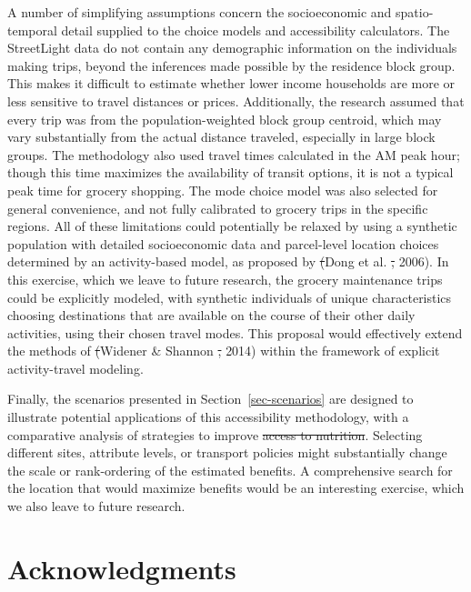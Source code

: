 \documentclass[
  letterpaper,
  number,
  review,
  3p]{elsarticle}
\makeatletter
\providecommand{\DIFadd}[1]{{\protect\color{blue}\uwave{#1}}} %
\providecommand{\DIFdel}[1]{{\protect\color{red}\sout{#1}}} %
\providecommand{\DIFaddbegin}{} %
\providecommand{\DIFaddend}{} %
\providecommand{\DIFdelbegin}{} %
\providecommand{\DIFdelend}{} %
\newcommand{\DIFscaledelfig}{0.5}
\newlength{\DIFdelgraphicswidth} %
\newlength{\DIFdelgraphicsheight} %
\newcommand{\DIFaddincludegraphics}[2][]{{\color{blue}\fbox{\DIFOincludegraphics[#1]{#2}}}} %
\newcommand{\DIFdelincludegraphics}[2][]{%
\sbox{\DIFdelgraphicsbox}{\DIFOincludegraphics[#1]{#2}}%
\settoboxwidth{\DIFdelgraphicswidth}{\DIFdelgraphicsbox} %
\settoboxtotalheight{\DIFdelgraphicsheight}{\DIFdelgraphicsbox} %
\scalebox{\DIFscaledelfig}{%
\parbox[b]{\DIFdelgraphicswidth}{\usebox{\DIFdelgraphicsbox}\\[-\baselineskip] \rule{\DIFdelgraphicswidth}{0em}}\llap{\resizebox{\DIFdelgraphicswidth}{\DIFdelgraphicsheight}{%
\setlength{\unitlength}{\DIFdelgraphicswidth}%
\begin{picture}(1,1)%
\thicklines\linethickness{2pt} %
{\color[rgb]{1,0,0}\put(0,0){\framebox(1,1){}}}%
{\color[rgb]{1,0,0}\put(0,0){\line( 1,1){1}}}%
{\color[rgb]{1,0,0}\put(0,1){\line(1,-1){1}}}%
\end{picture}%
}\hspace*{3pt}}} %
} %
\DeclareRobustCommand{\DIFaddbegin}{\DIFOaddbegin \let\includegraphics\DIFaddincludegraphics} %
\DeclareRobustCommand{\DIFaddend}{\DIFOaddend \let\includegraphics\DIFOincludegraphics} %
\DeclareRobustCommand{\DIFdelbegin}{\DIFOdelbegin \let\includegraphics\DIFdelincludegraphics} %
\DeclareRobustCommand{\DIFdelend}{\DIFOaddend \let\includegraphics\DIFOincludegraphics} %
\let\sout@orig\sout %
\renewcommand{\sout}[1]{\ifmmode\text{\sout@orig{\ensuremath{#1}}}\else\sout@orig{#1}\fi} %
\makeatother
\begin{document}
\DIFaddend A number of simplifying assumptions concern the socioeconomic and
spatio-temporal detail supplied to the choice models and accessibility
calculators. The StreetLight data do not contain any demographic
information on the individuals making trips, beyond the inferences made
possible by the residence block group. This makes it difficult to
estimate whether lower income households are more or less sensitive to
travel distances or prices. Additionally, the research assumed that
every trip was from the population-weighted block group centroid, which
may vary substantially from the actual distance traveled, especially in
large block groups. The methodology also used travel times calculated in
the AM peak hour; though this time maximizes the availability of transit
options, it is not a typical peak time for grocery shopping. The mode
choice model was also selected for general convenience, and not fully
calibrated to grocery trips in the specific regions. All of these
limitations could potentially be relaxed by using a synthetic population
with detailed socioeconomic data and parcel-level location choices
determined by an activity-based model, as proposed by \DIFdelbegin \DIFdel{(}\DIFdelend Dong et al.
\DIFdelbegin \DIFdel{,
}\DIFdelend \DIFaddbegin \DIFadd{(}\DIFaddend 2006). In this exercise, which we leave to future research, the grocery
maintenance trips could be explicitly modeled, with synthetic
individuals of unique characteristics choosing destinations that are
available on the course of their other daily activities, using their
chosen travel modes. This proposal would effectively extend the methods
of \DIFdelbegin \DIFdel{(}\DIFdelend Widener \& Shannon \DIFdelbegin \DIFdel{, }\DIFdelend \DIFaddbegin \DIFadd{(}\DIFaddend 2014) within the framework of explicit
activity-travel modeling.

Finally, the scenarios presented in Section~\ref{sec-scenarios} are
designed to illustrate potential applications of this accessibility
methodology, with a comparative analysis of strategies to improve \DIFdelbegin \DIFdel{access
to nutrition}\DIFdelend \DIFaddbegin \DIFadd{food
access}\DIFaddend . Selecting different sites, attribute levels, or transport
policies might substantially change the scale or rank-ordering of the
estimated benefits. A comprehensive search for the location that would
maximize benefits would be an interesting exercise, which we also leave
to future research.


\section*{Acknowledgments}\label{acknowledgments}
\end{document}

